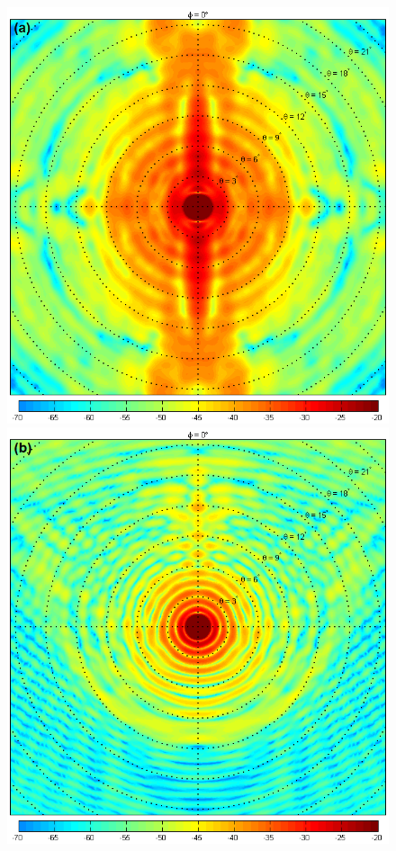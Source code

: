 \documentclass{aa}
\begin{document}
\begin{figure}
  \includegraphics[width=\columnwidth,clip=true,trim=0 42 0 0]{K7s_main}\hfill%
  \includegraphics[width=\columnwidth,clip=true,trim=0 42 0 0]{TU3e20_main}

\end{figure}
\end{document}
